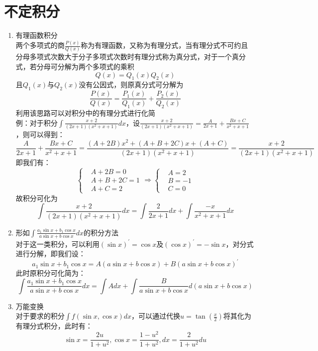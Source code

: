 \documentclass[12pt,a4paper,UTF8]{book}
\begin{document}
\section{不定积分}
\begin{enumerate}
\item 有理函数积分\\
两个多项式的商$\frac{P\left(x\right)}{Q\left(x\right)}$称为有理函数，又称为有理分式，当有理分式不可约且分母多项式次数大于分子多项式次数时有理分式称为真分式，对于一个真分式，若分母可分解为两个多项式的乘积
\[Q\left(x\right)=Q_1\left(x\right)Q_2\left(x\right)\]
且$Q_1\left(x\right)$与$Q_2\left(x\right)$没有公因式，则原真分式可分解为
\[\frac{P\left(x\right)}{Q\left(x\right)}=\frac{P_1\left(x\right)}{Q_1\left(x\right)}+\frac{P_2\left(x\right)}{Q_2\left(x\right)}\]
利用该思路可以对积分中的有理分式进行化简\\
例：对于积分$\int{\frac{x+2}{\left(2x+1\right)\left(x^2+x+1\right)}dx}$，设$\frac{x+2}{\left(2x+1\right)\left(x^2+x+1\right)}=\frac{A}{2x+1}+\frac{Bx+C}{x^2+x+1}$，则可以得到：
\[\frac{A}{2x+1}+\frac{Bx+C}{x^2+x+1}=\frac{\left(A+2B\right)x^2+\left(A+B+2C\right)x+\left(A+C\right)}{\left(2x+1\right)\left(x^2+x+1\right)}=\frac{x+2}{\left(2x+1\right)\left(x^2+x+1\right)}\]
即我们有：
\[\left\{
\begin{aligned}
&A+2B=0\\
&A+B+2C=1\\
&A+C=2
\end{aligned}
\right.
\Rightarrow
\left\{
\begin{aligned}
&A=2\\
&B=-1\\
&C=0
\end{aligned}
\right.\]
故积分可化为
\[\int{\frac{x+2}{\left(2x+1\right)\left(x^2+x+1\right)}dx}=\int{\frac{2}{2x+1}dx}+\int{\frac{-x}{x^2+x+1}dx}\]
\item 形如$\int{\frac{a_1\sin x+b_1\cos x}{a\sin x+b\cos x}dx}$的积分方法\\
\normalsize 对于这一类积分，可以利用$\left(\sin x\right)^\prime=\cos x$及$\left(\cos x\right)^\prime=-\sin x$，对分式进行分解，即我们设：
\[a_1\sin x+b_1\cos x=A\left(a\sin x+b\cos x\right)+B\left(a\sin x+b\cos x\right)^\prime\]
此时原积分可化简为：
\[\int{\frac{a_1\sin x+b_1\cos x}{a\sin x+b\cos x}dx}=\int{Adx}+\int{\frac{B}{a\sin x+b\cos x}d\left(a\sin x+b\cos x\right)}\]
\item 万能变换\\
对于要求的积分$\int{f\left(\sin x,\cos x\right)dx}$，可以通过代换$u=\tan\left(\frac{x}{2}\right)$将其化为有理分式积分，此时有：
\[\sin x=\frac{2u}{1+u^2}, \cos x=\frac{1-u^2}{1+u^2}, dx=\frac{2}{1+u^2}du\]
\end{enumerate}
\end{document}
